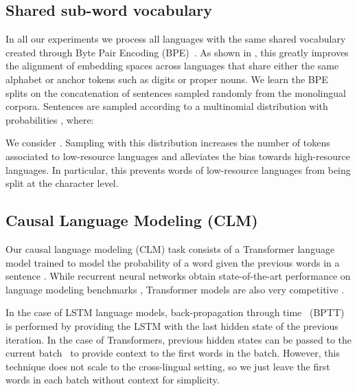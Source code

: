 \documentclass[11pt,a4paper]{article}
\begin{document}
\subsection{Shared sub-word vocabulary}
\label{subsec:subword}
In all our experiments we process all languages with the same shared vocabulary created through Byte Pair Encoding (BPE)~\cite{sennrich2015neural}. As shown in \citet{unsupNMTlample}, this greatly improves the alignment of embedding spaces across languages that share either the same alphabet or anchor tokens such as digits \cite{smith2017offline} or proper nouns. We learn the BPE splits on the concatenation of sentences sampled randomly from the monolingual corpora. Sentences are sampled according to a multinomial distribution with probabilities , where:

We consider . Sampling with this distribution increases the number of tokens associated to low-resource languages and alleviates the bias towards high-resource languages. In particular, this prevents words of low-resource languages from being split at the character level.

\subsection{Causal Language Modeling (CLM)}
\label{subsec:lmtask}
Our causal language modeling (CLM) task consists of a Transformer language model trained to model the probability of a word given the previous words in a sentence . While recurrent neural networks obtain state-of-the-art performance on language modeling benchmarks \cite{mikolov2010recurrent,jozefowicz2016exploring}, Transformer models are also very competitive \cite{dai2019transformerxl}.

In the case of LSTM language models, back-propagation through time~\cite{werbos1990backpropagation} (BPTT) is performed by providing the LSTM with the last hidden state of the previous iteration. In the case of Transformers, previous hidden states can be passed to the current batch~\cite{al2018character} to provide context to the first words in the batch. However, this technique does not scale to the cross-lingual setting,
so we just leave the first words in each batch without context for simplicity.
\end{document}
